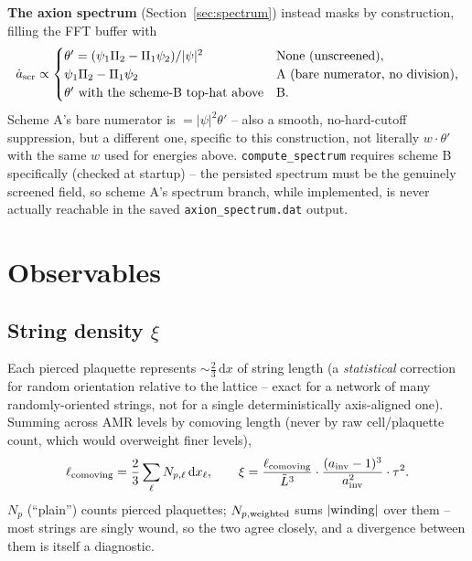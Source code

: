 \documentclass[11pt]{article}
\newcommand{\psivec}{\psi}
\newcommand{\Rt}{\tilde{L}}
\begin{document}
\textbf{The axion spectrum} (Section~\ref{sec:spectrum}) instead masks by construction, filling the FFT
buffer with
\[
\dot a_{\rm scr} \propto
\begin{cases}
\theta' = (\psivec_1\Pi_2-\Pi_1\psivec_2)/|\psivec|^2 & \text{None (unscreened),} \\
\psivec_1\Pi_2-\Pi_1\psivec_2 & \text{A (bare numerator, no division),} \\
\theta'\ \text{with the scheme-B top-hat above} & \text{B.}
\end{cases}
\]
Scheme A's bare numerator is $=|\psivec|^2\theta'$ -- also a smooth, no-hard-cutoff suppression, but a
different one, specific to this construction, not literally $w\cdot\theta'$ with the same $w$ used for
energies above. \texttt{compute\_spectrum} requires scheme B specifically (checked at startup) -- the
persisted spectrum must be the genuinely screened field, so scheme A's spectrum branch, while implemented,
is never actually reachable in the saved \texttt{axion\_spectrum.dat} output.

\section{Observables}
\label{sec:observables}

\subsection{String density \texorpdfstring{$\xi$}{xi}}
\label{sec:xi}
Each pierced plaquette represents $\sim\!\tfrac23\,\mathrm{d}x$ of string length (a \emph{statistical}
correction for random orientation relative to the lattice -- exact for a network of many randomly-oriented
strings, not for a single deterministically axis-aligned one). Summing across AMR levels by comoving length
(never by raw cell/plaquette count, which would overweight finer levels),
\[
\ell_{\rm comoving} = \frac{2}{3}\sum_\ell N_{p,\ell}\,\mathrm{d}x_\ell, \qquad
\xi = \frac{\ell_{\rm comoving}}{\Rt^3}\cdot\frac{(a_{\rm inv}-1)^3}{a_{\rm inv}^2}\cdot\tau^2.
\]
$N_p$ (``plain'') counts pierced plaquettes; $N_{p,\rm weighted}$ sums $|{\rm winding}|$ over them -- most
strings are singly wound, so the two agree closely, and a divergence between them is itself a diagnostic.
\end{document}
